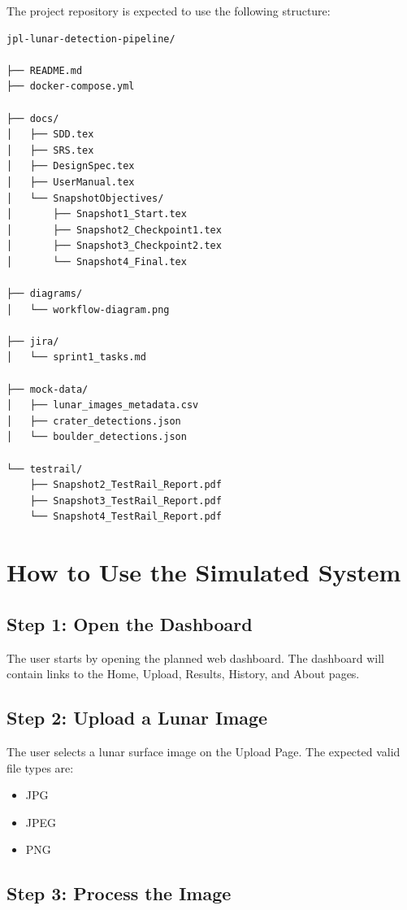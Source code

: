 \documentclass[12pt]{article}
\begin{document}
The project repository is expected to use the following structure:

\begin{verbatim}
jpl-lunar-detection-pipeline/

├── README.md
├── docker-compose.yml

├── docs/
│   ├── SDD.tex
│   ├── SRS.tex
│   ├── DesignSpec.tex
│   ├── UserManual.tex
│   └── SnapshotObjectives/
│       ├── Snapshot1_Start.tex
│       ├── Snapshot2_Checkpoint1.tex
│       ├── Snapshot3_Checkpoint2.tex
│       └── Snapshot4_Final.tex

├── diagrams/
│   └── workflow-diagram.png

├── jira/
│   └── sprint1_tasks.md

├── mock-data/
│   ├── lunar_images_metadata.csv
│   ├── crater_detections.json
│   └── boulder_detections.json

└── testrail/
    ├── Snapshot2_TestRail_Report.pdf
    ├── Snapshot3_TestRail_Report.pdf
    └── Snapshot4_TestRail_Report.pdf
\end{verbatim}

\section{How to Use the Simulated System}

\subsection{Step 1: Open the Dashboard}

The user starts by opening the planned web dashboard. The dashboard will contain links to the Home, Upload, Results, History, and About pages.

\subsection{Step 2: Upload a Lunar Image}

The user selects a lunar surface image on the Upload Page. The expected valid file types are:

\begin{itemize}
    \item JPG
    \item JPEG
    \item PNG
\end{itemize}

\subsection{Step 3: Process the Image}
\end{document}
